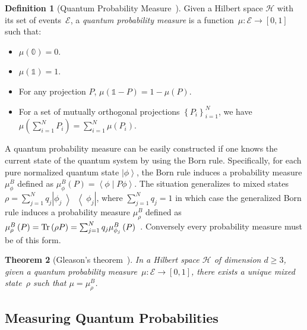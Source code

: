 \documentclass[12pt]{iopart}
\theoremstyle{plain}
\newtheorem{thm}{Theorem}
\theoremstyle{definition}
\newtheorem{definition}[thm]{Definition}
\newcommand{\Hilb}{\mathcal{H}}
\newcommand{\events}{\ensuremath{\mathcal{E}}}
\newcommand{\ket}[1]{{\left\vert{#1}\right\rangle}}
\newcommand{\op}[2]{\ensuremath{\left\vert{#1}\middle\rangle\middle\langle{#2}\right\vert}}
\newcommand{\proj}[1]{\op{#1}{#1}}
\newcommand{\ip}[2]{\ensuremath{\left\langle{#1}\middle\vert{#2}\right\rangle}}
\begin{document}
\begin{definition}[Quantum Probability Measure~\cite{10.2307/2308516,gleason1957,Redhead1987-REDINA,Maassen2010}]\label{def:QuantumProbabilitySpace}
Given a Hilbert space $\Hilb$ with its set of events~$\events$,
a \emph{quantum probability measure} is a function~$\mu:\events\rightarrow[0,1]$
such that: 
\begin{itemize}
\item $\mu(\mathbb{0})=0$. 
\item $\mu(\mathbb{1})=1$. 
\item For any projection $P$, $\mu\left(\mathbb{1}-P\right)=1-\mu\left(P\right)$.
\item For a set of mutually orthogonal projections $\left\{ P_{i}\right\} _{i=1}^{N}$,
we have $\mu\left(\sum_{i=1}^{N}P_{i}\right)=\sum_{i=1}^{N}\mu\left(P_{i}\right)$.
\end{itemize}
\end{definition}

\noindent A quantum probability measure can be easily constructed if
one knows the current state of the quantum system by using the Born
rule.  Specifically, for each
pure normalized quantum state $\ket{\phi}$, the Born rule induces a
probability measure $\mu_{\phi}^{B}$ defined as
$\mu_{\phi}^{B}(P)=\ip{\phi}{P\phi}$. The situation generalizes to
mixed states $\rho = \sum_{j=1}^{N}q_{j}\proj{\phi_{j}}$, where
$\sum_{j=1}^{N}q_{j}=1$ in which case the generalized Born rule
induces a probability measure $\mu_{\rho}^{B}$ defined
as
$\mu_{\rho}^{B}\left(P\right) = \mathop{\mathrm{Tr}}\nolimits\left(\rho P\right) =
\sum_{j=1}^{N}
q_{j}\mu_{\phi_{j}}^{B}\left(P\right)$~\cite{peres1995quantum,544199,Jaeger2007}.
Conversely every probability measure must be of this form.

\begin{thm}[Gleason's
  theorem~\cite{gleason1957,Redhead1987-REDINA,peres1995quantum}]\label{cor:Gleason's}In
a Hilbert space $\Hilb$ of dimension $d\geq3$, given a quantum probability
measure~$\mu:\events\rightarrow[0,1]$, there exists a unique mixed
state~$\rho$ such that $\mu=\mu_{\rho}^{B}$.
\end{thm}

\subsection{Measuring Quantum Probabilities}
\end{document}
